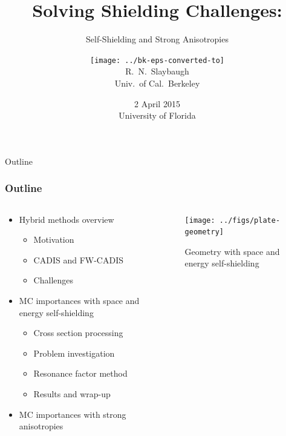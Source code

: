 \documentclass[xcolor=x11names,compress]{beamer}
\renewcommand{\(}{\begin{columns}}
\renewcommand{\)}{\end{columns}}
\newcommand{\<}[1]{\begin{column}{#1}}
\renewcommand{\>}{\end{column}}
\begin{document}
\begin{frame}
\title{Solving Shielding Challenges:}
\subtitle{Self-Shielding and Strong Anisotropies}
\author{\texttt{[image: ../bk-eps-converted-to]}\\R.\ N.\ Slaybaugh \\ Univ.\ of Cal.\ Berkeley}
\date{2 April 2015 \\ University of Florida}
\titlepage
\end{frame}


\begin{frame}[fragile]{Outline}
  \frametitle{Outline}

\begin{columns}
  \begin{column}{0.6\textwidth}
    \begin{itemize}
    \item Hybrid methods overview
    \begin{itemize}
    		\item Motivation
		\item CADIS and FW-CADIS
		\item Challenges
    \end{itemize}
    	\item MC importances with space and energy self-shielding
	\begin{itemize}
    		\item Cross section processing
		\item Problem investigation
		\item Resonance factor method
		\item Results and wrap-up
  	\end{itemize}
	\item MC importances with strong anisotropies
  \end{itemize}
  \end{column}
  \begin{column}{0.4\textwidth}
  	\begin{figure}
  	\begin{center}
  		\texttt{[image: ../figs/plate-geometry]}
		\caption{Geometry with space and energy self-shielding}
	\end{center}
  	\end{figure}
  \end{column}
\end{columns}

\end{frame}
\end{document}
